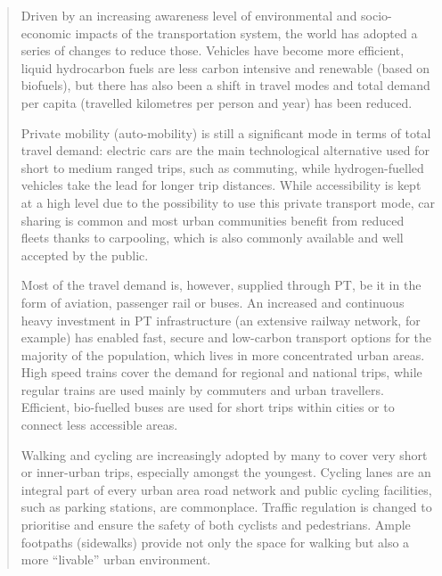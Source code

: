 \blockquote{Driven by an increasing awareness level of environmental and socio-economic impacts of the transportation system, the world has adopted a series of changes to reduce those. Vehicles have become more efficient, liquid hydrocarbon fuels are less carbon intensive and renewable (based on biofuels), but there has also been a shift in travel modes and total demand per capita (travelled kilometres per person and year) has been reduced.

Private mobility (auto-mobility) is still a significant mode in terms of total travel demand: electric cars are the main technological alternative used for short to medium ranged trips, such as commuting, while hydrogen-fuelled vehicles take the lead for longer trip distances. While accessibility is kept at a high level due to the possibility to use this private transport mode, car sharing is common and most urban communities benefit from reduced fleets thanks to carpooling, which is also commonly available and well accepted by the public.

Most of the travel demand is, however, supplied through \gls{PT}, be it in the form of aviation, passenger rail or buses. An increased and continuous heavy investment in \gls{PT} infrastructure (an extensive railway network, for example) has enabled fast, secure and low-carbon transport options for the majority of the population, which lives in more concentrated urban areas. High speed trains cover the demand for regional and national trips, while regular trains are used mainly by commuters and urban travellers. Efficient, bio-fuelled buses are used for short trips within cities or to connect less accessible areas.

Walking and cycling are increasingly adopted by many to cover very short or inner-urban trips, especially amongst the youngest. Cycling lanes are an integral part of every urban area road network and public cycling facilities, such as parking stations, are commonplace. Traffic regulation is changed to prioritise and ensure the safety of both cyclists and pedestrians. Ample footpaths (sidewalks) provide not only the space for walking but also a more ``livable'' urban environment.
}

